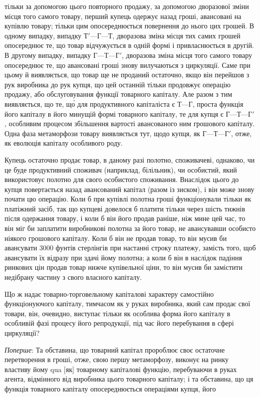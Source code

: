 \parcont{}  %
тільки за допомогою цього повторного продажу, за допомогою
дворазової зміни місця того самого товару, перший купець одержує назад гроші, авансовані на купівлю
товару; тільки цим
опосереднюється повернення до нього цих грошей. В одному
випадку, випадку $Т' — Г — Т$, дворазова зміна місця тих самих грошей опосереднює те, що товар
відчужується в одній
формі і привласнюється в другій. В другому випадку, випадку
$Г — Т — Г'$, дворазова зміна місця того самого товару опосереднює те, що авансовані гроші знову
вилучаються з циркуляції.
Саме при цьому й виявляється, що товар ще не проданий остаточно, якщо він перейшов з рук виробника
до рук купця, що
цей останній тільки продовжує операцію продажу, або обслуговування функції товарного капіталу. Але
разом з тим виявляється, що те, що́ для продуктивного капіталіста є $Т — Г$,
проста функція його капіталу в його минущій формі товарного
капіталу, те для купця є $Г — Т — Г'$, особливим процесом збільшення вартості авансованого ним
грошового капіталу. Одна
фаза метаморфози товару виявляється тут, щодо купця, як
$Г — Т — Г'$, отже, як еволюція капіталу особливого роду.

Купець остаточно продає товар, в даному разі полотно,
споживачеві, однаково, чи це буде продуктивний споживач (наприклад, білільник), чи особистий, який
використовує полотно
для свого особистого споживання. Внаслідок цього до купця
повертається назад авансований капітал (разом із зиском), і він
може знову почати цю операцію. Коли б при купівлі полотна
гроші функціонували тільки як платіжний засіб, так що купцеві довелося б платити тільки через шість
тижнів після одержання товару, і коли б він його продав раніше, ніж мине цей
час, то він міг би заплатити виробникові полотна за його товар,
не авансувавши особисто ніякого грошового капіталу. Коли б він
не продав товар, то він мусив би авансувати 3000 фунтів стерлінгів при настанні строку платежу,
замість того, щоб авансувати їх відразу при здачі йому полотна; а коли б він в наслідок падіння
ринкових цін продав товар нижче купівельної ціни,
то він мусив би замістити недібрану частину з свого власного капіталу.

Що ж надає товарно-торговельному капіталові характеру
самостійно функціонуючого капіталу, тимчасом як у руках виробника, який сам продає свої товари, він,
очевидно, виступає
тільки як особлива форма його капіталу в особливій фазі процесу його репродукції, під час його
перебування в сфері циркуляції?

\emph{Поперше}: Та обставина, що товарний капітал пророблює своє
остаточне перетворення в гроші, отже, свою першу метаморфозу, виконує на ринку властиву йому qua
[як] товарному капіталові функцію, перебуваючи в руках агента, відмінного від
виробника цього товарного капіталу; і та обставина, що ця функція товарного капіталу опосереднюється
операціями купця, його
\parbreak{}  %
